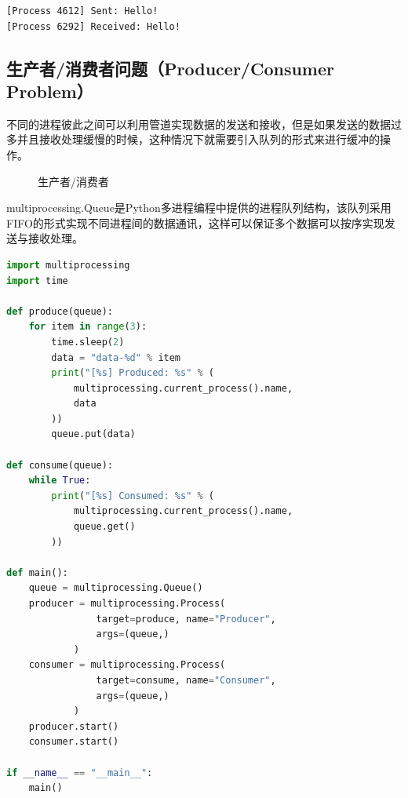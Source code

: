 \begin{tcolorbox}
    \begin{verbatim}
[Process 4612] Sent: Hello!
[Process 6292] Received: Hello!
	\end{verbatim}
\end{tcolorbox}

\vspace{0.5cm}

\subsection{生产者/消费者问题（Producer/Consumer Problem）}

不同的进程彼此之间可以利用管道实现数据的发送和接收，但是如果发送的数据过多并且接收处理缓慢的时候，这种情况下就需要引入队列的形式来进行缓冲的操作。

\begin{figure}[H]
    \centering
    \caption{生产者/消费者}
\end{figure}

multiprocessing.Queue是Python多进程编程中提供的进程队列结构，该队列采用FIFO的形式实现不同进程间的数据通讯，这样可以保证多个数据可以按序实现发送与接收处理。\\


\begin{lstlisting}[language=Python]
import multiprocessing
import time

def produce(queue):
    for item in range(3):
        time.sleep(2)
        data = "data-%d" % item
        print("[%s] Produced: %s" % (
            multiprocessing.current_process().name,
            data
        ))
        queue.put(data)

def consume(queue):
    while True:
        print("[%s] Consumed: %s" % (
            multiprocessing.current_process().name,
            queue.get()
        ))

def main():
    queue = multiprocessing.Queue()
    producer = multiprocessing.Process(
                target=produce, name="Producer",
                args=(queue,)
            )
    consumer = multiprocessing.Process(
                target=consume, name="Consumer",
                args=(queue,)
            )
    producer.start()
    consumer.start()

if __name__ == "__main__":
    main()
\end{lstlisting}

